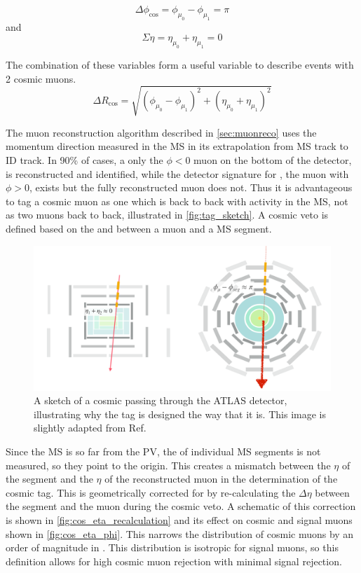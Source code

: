 \begin{equation}
\Delta \phi_{\text{cos}} = \phi_{\mu_{0}} - \phi_{\mu_{1}} = \pi 
\end{equation}
and 
\begin{equation}
\Sigma \eta = \eta_{\mu_{0}} + \eta_{\mu_{1}} = 0
\end{equation} 

The combination of these variables form a useful variable to describe events with 2 cosmic muons.
\begin{equation}
\Delta R_{\text{cos}} = \sqrt{ (\phi_{\mu_{0}} - \phi_{\mu_{1}})^{2} + (\eta_{\mu_{0}} + \eta_{\mu_{1}})^2}
\end{equation}

The muon reconstruction algorithm described in \autoref{sec:muonreco} uses the momentum direction measured in the \ac{MS} in its extrapolation from \ac{MS} track to \ac{ID} track. In 90\% of cases, a only the  $\phi < 0$ muon on the bottom of the detector, \mb is reconstructed and identified, while the detector signature for \mt, the muon with $\phi > 0$, exists but the fully reconstructed muon does not. Thus it is advantageous to tag a cosmic muon as one which is back to back with activity in the \ac{MS}, not as two muons back to back, illustrated in \autoref{fig:tag_sketch}. A cosmic veto is defined based on the \dphicos and \sigeta between a muon and a \ac{MS} segment. 

\begin{figure}[htbp]
\centering
\includegraphics[width=.8\textwidth]{figures/cosmics/tag_sketch.png}
\caption{A sketch of a cosmic passing through the ATLAS detector, illustrating why the tag is designed the way that it is. This image is slightly adapted from Ref.~\cite{ATLAS-CONF-2019-006}}
\label{fig:tag_sketch}
\end{figure}

Since the \ac{MS} is so far from the \ac{PV}, the \z of individual MS segments is not measured, so they point to the origin. This creates a mismatch between the $\eta$ of the segment and the $\eta$ of the reconstructed muon in the determination of the cosmic tag. This is geometrically corrected for by re-calculating the $\Delta\eta$ between the segment and the muon during the cosmic veto. A schematic of this correction is shown in \autoref{fig:cos_eta_recalculation} and its effect on cosmic and signal muons shown in \autoref{fig:cos_eta_phi}. This narrows the distribution of cosmic muons by an order of magnitude in \sigeta. This distribution is isotropic for signal muons, so this definition allows for high cosmic muon rejection with minimal signal rejection. 


